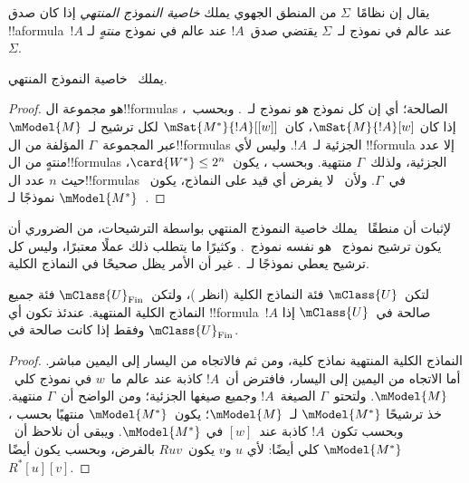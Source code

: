 \documentclass[../../../include/open-logic-section]{subfiles}
\begin{document}


\begin{defn}
  يقال إن نظامًا~$\Sigma$ من المنطق الجهوي يملك \emph{خاصية النموذج
    المنتهي} إذا كان صدق !!a{formula}~$!A$ عند عالم في نموذج
  لـ~$\Sigma$ يقتضي صدق~$!A$ عند عالم في نموذج \emph{منتهٍ} لـ~$\Sigma$.
\end{defn}

\begin{prop}
  يملك~ خاصية النموذج المنتهي.
\end{prop}

\begin{proof}
   هو مجموعة ال!!{formula}s الصالحة؛ أي إن كل نموذج هو نموذج
  لـ~. وبحسب~، إذا كان
  $\mSat{M}{!A}[w]$، كان~$\mSat{M^*}{!A}[{[w]}]$ لكل ترشيح
  لـ~$\mModel{M}$ عبر المجموعة~$\Gamma$ المؤلفة من ال!!{formula}s
  الجزئية لـ~$!A$. وليس لأي !!{formula} إلا عدد منتهٍ من
  ال!!{formula}s الجزئية، ولذلك~$\Gamma$ منتهية. وبحسب
  ، يكون~$\card{W^*} \le 2^n$، حيث
  $n$ عدد ال!!{formula}s في~$\Gamma$. ولأن~ لا يفرض أي قيد على
  النماذج، يكون~$\mModel{M^*}$ نموذجًا لـ~.
\end{proof}

لإثبات أن منطقًا~ يملك خاصية النموذج المنتهي بواسطة الترشيحات، من
الضروري أن يكون ترشيح نموذج~ هو نفسه نموذج~. وكثيرًا ما
يتطلب ذلك عملًا معتبرًا، وليس كل ترشيح يعطي نموذجًا لـ~. غير أن
الأمر يظل صحيحًا في النماذج الكلية.

\begin{prop}
  لتكن~$\mClass{U}$ فئة النماذج الكلية (انظر
  )، ولتكن~$\mClass{U}_\mathrm{Fin}$
  فئة جميع النماذج الكلية المنتهية. عندئذ تكون أي !!{formula}~$!A$
  صالحة في~$\mClass{U}$ إذا وفقط إذا كانت صالحة في
  $\mClass{U}_\mathrm{Fin}$.
\end{prop}

\begin{proof}
  النماذج الكلية المنتهية نماذج كلية، ومن ثم فالاتجاه من اليسار إلى اليمين
  مباشر. أما الاتجاه من اليمين إلى اليسار، فافترض أن~$!A$ كاذبة عند عالم
  ما~$w$ في نموذج كلي~$\mModel{M}$. ولتحتو~$\Gamma$ الصيغة~$!A$ وجميع
  صيغها الجزئية؛ ومن الواضح أن~$\Gamma$ منتهية. خذ ترشيحًا
  $\mModel{M^*}$ لـ~$\mModel{M}$؛ يكون~$\mModel{M^*}$ منتهيًا بحسب
  ، وبحسب
   تكون~$!A$ كاذبة عند~$[w]$ في
  $\mModel{M^*}$. ويبقى أن نلاحظ أن~$\mModel{M^*}$ كلي أيضًا: لأي
  $u$ و$v$ يكون~$Ruv$ بالفرض، وبحسب
   يكون أيضًا
  $R^*[u][v]$.
\end{proof}
\end{document}
